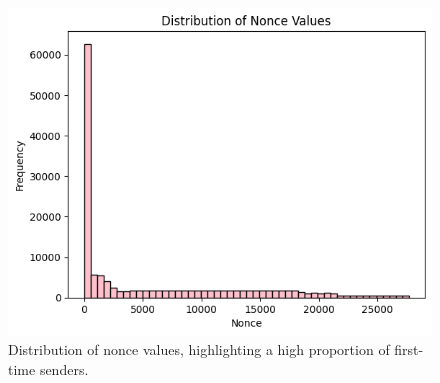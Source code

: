 \documentclass[sigconf]{acmart}
\begin{document}
\begin{figure}[H]
    \centering
    \includegraphics[width=0.8\linewidth]{M4-nonce-distro.png}
    \caption{Distribution of nonce values, highlighting a high proportion of first-time senders.}
    \label{fig:nonceDistro}
\end{figure}



 
\end{document}
